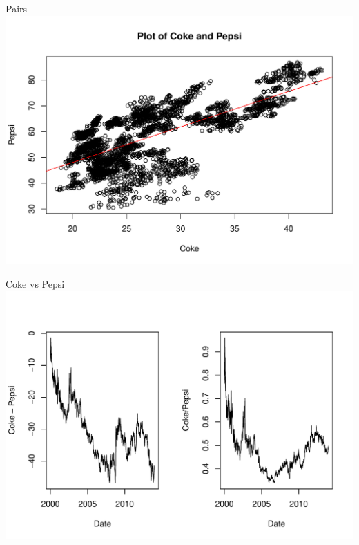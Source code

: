 \documentclass[14pt,xcolor=pdftex,dvipsnames,table]{beamer}\usepackage[]{graphicx}\usepackage[]{color}
\makeatletter
\def\maxwidth{ %
  \ifdim\Gin@nat@width>\linewidth
    \linewidth
  \else
    \Gin@nat@width
  \fi
}
\newenvironment{knitrout}{}{} %
\makeatother
\begin{document}
\begin{frame}{Pairs}
\begin{knitrout}
\color{fgcolor}
\includegraphics[width=\maxwidth]{figure/Coke} 

\end{knitrout}

\end{frame}

\begin{frame}{Coke vs Pepsi}
\begin{knitrout}
\color{fgcolor}
\includegraphics[width=\maxwidth]{figure/CvP} 

\end{knitrout}

\end{frame}
\end{document}
